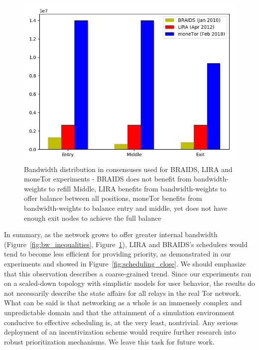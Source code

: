 \begin{figure}
	\centering \includegraphics[scale=0.415]{images/bw_analysis_comp.png}
  \caption{Bandwidth distribution in consensuses used for BRAIDS, LIRA and moneTor experiments - BRAIDS does not benefit from bandwidth-weights to refill Middle, LIRA benefits from bandwidth-weights to offer balance between all positions, moneTor benefits from bandwidth-weights to balance entry and middle, yet does not have enough exit nodes to achieve the full balance}
  \label{fig:bw_comp}
\end{figure}
 
In summary, as the network grows to offer greater internal bandwidth (Figure~\ref{fig:bw_inequalities}, Figure~\ref{fig:bw_comp}), LIRA and BRAIDS's schedulers would tend to become less efficient for providing priority, as demonstrated in our experiments and showed in Figure~\ref{fig:scheduling_close}.
We should emphasize that this observation describes a coarse-grained trend.
Since our experiments ran on a scaled-down topology with simplistic models for user behavior, the results do not necessarily describe the state affairs for all relays in the real Tor network.
What can be said is that networking as a whole is an immensely complex and unpredictable domain and that the attainment of a simulation environment conducive to effective scheduling is, at the very least, nontrivial.
Any serious deployment of an incentivization scheme would require further research into robust prioritization mechanisms.
We leave this task for future work.
